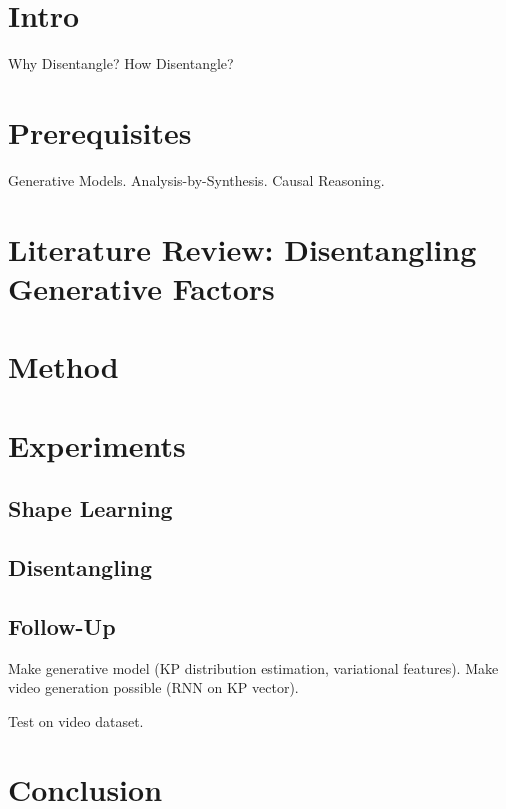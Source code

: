 \chapter{Intro}
Why Disentangle?
How Disentangle?

\chapter{Prerequisites}
Generative Models.
Analysis-by-Synthesis.
Causal Reasoning.

\chapter{Literature Review: Disentangling Generative Factors}

\chapter{Method}

\chapter{Experiments}

\section{Shape Learning}
\section{Disentangling}

\section{Follow-Up}
Make generative model (KP distribution estimation, variational features).
Make video generation possible (RNN on KP vector).

Test on video dataset.

\chapter{Conclusion}
